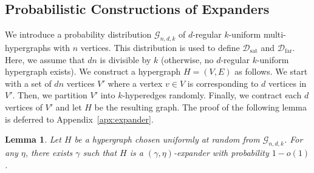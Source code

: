 \documentclass[letterpaper,11pt]{article}
\newtheorem{lemma}[theorem]{Lemma}
\newcommand{\caldsat}{\mathcal{D}_{\mathrm{sat}}}
\newcommand{\caldfar}{\mathcal{D}_{\mathrm{far}}}
\newcommand{\calg}{\mathcal{G}}
\begin{document}
\subsection{Probabilistic Constructions of Expanders}\label{sec:expander}
We introduce a probability distribution $\calg_{n,d,k}$ of $d$-regular $k$-uniform multi-hypergraphs with $n$ vertices.
This distribution is used to define $\caldsat$ and $\caldfar$.
Here, we assume that $dn$ is divisible by $k$ (otherwise, no $d$-regular $k$-uniform hypergraph exists).
We construct a hypergraph $H=(V,E)$ as follows.
We start with a set of $dn$ vertices $V'$ where a vertex $v\in V$ is corresponding to $d$ vertices in $V'$.
Then, we partition $V'$ into $k$-hyperedges randomly.
Finally, we contract each $d$ vertices of $V'$ and let $H$ be the resulting graph.
The proof of the following lemma is deferred to Appendix~\ref{apx:expander}.
\begin{lemma}\label{lmm:expander}
  Let $H$ be a hypergraph chosen uniformly at random from $\calg_{n,d,k}$.
  For any $\eta$,
  there exists $\gamma$ such that $H$ is a $(\gamma,\eta)$-expander with probability $1-o(1)$.
\end{lemma}
\end{document}
